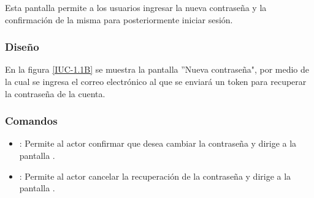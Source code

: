 Esta pantalla permite a los usuarios ingresar la nueva contraseña y la confirmación de la misma para posteriormente iniciar sesión.

\subsubsection{Diseño}

En la figura \ref{IUC-1.1B} se muestra la pantalla ''Nueva contraseña", por medio de la cual se ingresa el correo electrónico al que se enviará un token para recuperar la contraseña de la cuenta. 


\subsubsection{Comandos}
\begin{itemize}
	\item {}: Permite al actor confirmar que desea cambiar la contraseña y dirige a la pantalla .
	\item {}: Permite al actor cancelar la recuperación de la contraseña y dirige a la pantalla .
\end{itemize}
